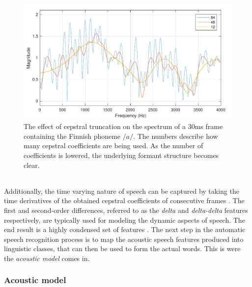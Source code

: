 \documentclass[english, 12pt, a4paper, pdftex, elec, utf8]{aaltothesis}
\begin{document}
\begin{figure}[h]
	\centering
	\includegraphics[trim={0.1cm 0cm 0cm 0.4cm}, clip, width=\textwidth]{cepstrum.pdf}
	\caption{The effect of cepstral truncation on the spectrum of a 30ms frame containing the Finnish phoneme $/a/$. The numbers describe how many cepstral coefficients are being used. As the number of coefficients is lowered, the underlying formant structure becomes clear.}
	\label{fig:cepstrum} 
\end{figure} \\
Additionally, the time varying nature of speech can be captured by taking the time derivatives of the obtained cepstral coefficients of consecutive frames \cite{gales2008application, kallasjoki2016}. The first and second-order differences, referred to as the \textit{delta} and \textit{delta-delta} features respectively, are typically used for modeling the dynamic aspects of speech. The end result is a highly condensed set of features \cite{huang2001spoken, gales2008application}. The next step in the automatic speech recognition process is to map the acoustic speech features produced into linguistic classes, that can then be used to form the actual words. This is were the \textit{acoustic model} comes in.

\subsubsection{Acoustic model}
\end{document}
